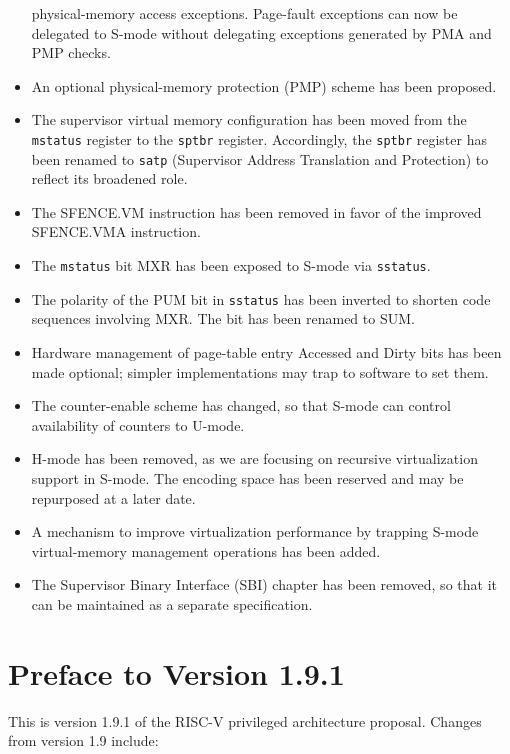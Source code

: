 \begin{itemize}
  physical-memory access exceptions.  Page-fault exceptions can now be
  delegated to S-mode without delegating exceptions generated by PMA
  and PMP checks.
\item An optional physical-memory protection (PMP) scheme has been proposed.
\item The supervisor virtual memory configuration has been moved from the
  {\tt mstatus} register to the {\tt sptbr} register.  Accordingly, the
  {\tt sptbr} register has been renamed to {\tt satp} (Supervisor Address
  Translation and Protection) to reflect its broadened role.
\item The SFENCE.VM instruction has been removed in favor of the improved
  SFENCE.VMA instruction.
\item The {\tt mstatus} bit MXR has been exposed to S-mode via {\tt sstatus}.
\item The polarity of the PUM bit in {\tt sstatus} has been inverted to
  shorten code sequences involving MXR.  The bit has been renamed to SUM.
\item Hardware management of page-table entry Accessed and Dirty bits has
  been made optional; simpler implementations may trap to software to
  set them.
\item The counter-enable scheme has changed, so that S-mode can
  control availability of counters to U-mode.
\item H-mode has been removed, as we are focusing on recursive
  virtualization support in S-mode.  The encoding space has been
  reserved and may be repurposed at a later date.
\item A mechanism to improve virtualization performance by
  trapping S-mode virtual-memory management operations has been added.
\item The Supervisor Binary Interface (SBI) chapter has been removed, so
  that it can be maintained as a separate specification.
\end{itemize}

\newpage

\section*{Preface to Version 1.9.1}

This is version 1.9.1 of the RISC-V privileged architecture
proposal.  Changes from version 1.9 include:


